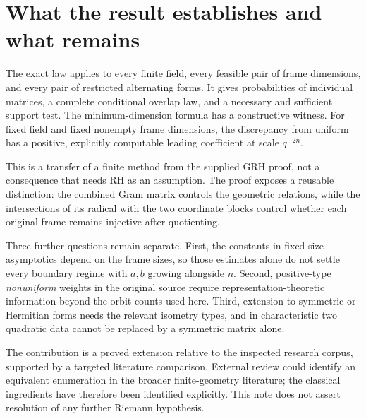 \section{What the result establishes and what remains}

The exact law applies to every finite field, every feasible pair of frame dimensions, and every pair of restricted alternating forms. It gives probabilities of individual matrices, a complete conditional overlap law, and a necessary and sufficient support test. The minimum-dimension formula has a constructive witness. For fixed field and fixed nonempty frame dimensions, the discrepancy from uniform has a positive, explicitly computable leading coefficient at scale $q^{-2n}$.

This is a transfer of a finite method from the supplied GRH proof, not a consequence that needs RH as an assumption. The proof exposes a reusable distinction: the combined Gram matrix controls the geometric relations, while the intersections of its radical with the two coordinate blocks control whether each original frame remains injective after quotienting.

Three further questions remain separate. First, the constants in fixed-size asymptotics depend on the frame sizes, so those estimates alone do not settle every boundary regime with $a,b$ growing alongside $n$. Second, positive-type \emph{nonuniform} weights in the original source require representation-theoretic information beyond the orbit counts used here. Third, extension to symmetric or Hermitian forms needs the relevant isometry types, and in characteristic two quadratic data cannot be replaced by a symmetric matrix alone.

The contribution is a proved extension relative to the inspected research corpus, supported by a targeted literature comparison. External review could identify an equivalent enumeration in the broader finite-geometry literature; the classical ingredients have therefore been identified explicitly. This note does not assert resolution of any further Riemann hypothesis.
